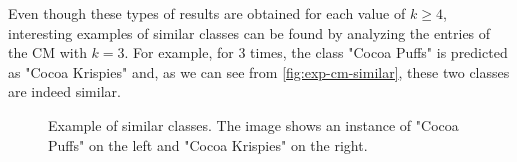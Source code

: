 Even though these types of results are obtained for each value of $k \geq 4$, interesting examples of similar classes can be found by analyzing the entries of the CM with $k = 3$.
For example, for $3$ times, the class "Cocoa Puffs" is predicted as "Cocoa Krispies" and, as we can see from \autoref{fig:exp-cm-similar}, these two classes are indeed similar.

\begin{figure}[H]
	\centering
    \qquad
    \caption{Example of similar classes. The image shows an instance of "Cocoa Puffs" on the left and "Cocoa Krispies" on the right.}
	\label{fig:exp-cm-similar}
\end{figure}
